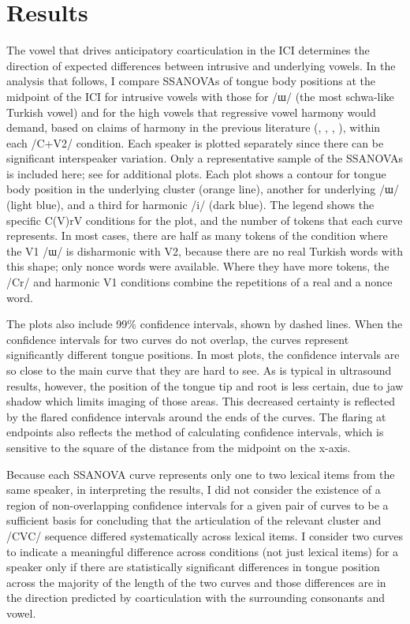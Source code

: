 \documentclass[output=paper,colorlinks,citecolor=brown]{langscibook}
\begin{document}
\section{Results}

The vowel that drives anticipatory coarticulation in the ICI determines the direction of expected differences between intrusive and underlying vowels. In the analysis that follows, I compare SSANOVAs of tongue body positions at the midpoint of the ICI for intrusive vowels with those for /ɯ/ (the most schwa-like Turkish vowel) and for the high vowels that regressive vowel harmony would demand, based on claims of harmony in the previous literature (\citealt{Yavas1980}, \citealt{ClementsSezer:1982}, \citealt{Kaun1999}, \citealt{Yildiz2010}), within each /C+V2/ condition. Each speaker is plotted separately since there can be significant interspeaker variation. Only a representative sample of the SSANOVAs is included here; see \citet[ch.2]{Bellik2019a} for additional plots. Each plot shows a contour for tongue body position in the underlying cluster (orange line), another for underlying /ɯ/ (light blue), and a third for harmonic /i/ (dark blue). The legend shows the specific C(V)rV conditions for the plot, and the number of tokens that each curve represents. In most cases, there are half as many tokens of the condition where the V1 /ɯ/ is disharmonic with V2, because there are no real Turkish words with this shape; only nonce words were available. Where they have more tokens, the /Cr/ and harmonic V1 conditions combine the repetitions of a real and a nonce word.

The plots also include 99\% confidence intervals, shown by dashed lines. When the confidence intervals for two curves do not overlap, the curves represent significantly different tongue positions. In most plots, the confidence intervals are so close to the main curve that they are hard to see. As is typical in ultrasound results, however, the position of the tongue tip and root is less certain, due to jaw shadow which limits imaging of those areas. This decreased certainty is reflected by the flared confidence intervals around the ends of the curves. The flaring at endpoints also reflects the method of calculating confidence intervals, which is sensitive to the square of the distance from the midpoint on the x-axis.

Because each SSANOVA curve represents only one to two lexical items from the same speaker, in interpreting the results, I did not consider the existence of a region of non-overlapping confidence intervals for a given pair of curves to be a sufficient basis for concluding that the articulation of the relevant cluster and /CVC/ sequence differed systematically across lexical items. I consider two curves to indicate a meaningful difference across conditions (not just lexical items) for a speaker only if there are statistically significant differences in tongue position across the majority of the length of the two curves and those differences are in the direction predicted by coarticulation with the surrounding consonants and vowel.
\end{document}
